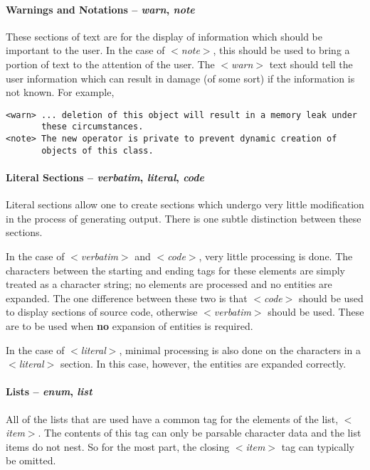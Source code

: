 \paragraph{Warnings and Notations -- \textit{warn}, \textit{note}}

These sections of text are for the display of information which should be
important to the user. In the case of \textit{$<$note$>$}, this should be used to
bring a portion of text to the attention of the user. The \textit{$<$warn$>$} text
should tell the user information which can result in damage (of some
sort) if the information is not known. For example,
\begin{verbatim}
<warn> ... deletion of this object will result in a memory leak under
       these circumstances.
<note> The new operator is private to prevent dynamic creation of
       objects of this class.
\end{verbatim}
\noindent

\paragraph{Literal Sections -- \textit{verbatim}, \textit{literal}, \textit{code}}

Literal sections allow one to create sections which undergo very little 
modification in the process of generating output. There is one subtle
distinction between these sections.

In the case of \textit{$<$verbatim$>$} and \textit{$<$code$>$}, very little processing is done.
The characters between the starting and ending tags for these elements are
simply treated as a character string; no elements are processed and no
entities are expanded. The one difference between these two is that
\textit{$<$code$>$} should be used to display sections of source code, otherwise
\textit{$<$verbatim$>$} should be used. These are to be used when \textbf{no} expansion
of entities is required.

In the case of \textit{$<$literal$>$}, minimal processing is also done on the characters
in a \textit{$<$literal$>$} section. In this case, however, the entities are expanded
correctly.

\paragraph{Lists -- \textit{enum}, \textit{list}}

All of the lists that are used have a common tag for the elements of the 
list, \textit{$<$item$>$}. The contents of this tag can only be parsable character
data and the list items do not nest. So for the most part, the closing
\textit{$<$item$>$} tag can typically be omitted.

